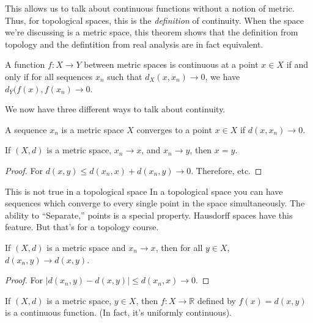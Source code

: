 \documentclass[crop=false,class=article,oneside]{standalone}
\begin{document}
            This allows us to talk about continuous
            functions without a notion of metric.
            Thus, for topological spaces, this is
            the \textit{definition} of continuity.
            When the space we're discussing is a
            metric space, this theorem shows that the
            definition from topology and the defintition
            from real analysis are in fact equivalent.
            \begin{theorem}
                A function $f:X\rightarrow{Y}$ between
                metric spaces is continuous at a point
                $x\in{X}$ if and only if for all
                sequences $x_{n}$ such that
                $d_{X}(x,x_{n})\rightarrow{0}$, we have
                $d_{Y}(f(x),f(x_{n})\rightarrow{0}$.
            \end{theorem}
            We now have three different ways to talk
            about continuity.
            \begin{definition}
                A sequence $x_{n}$ is a metric space
                $X$ converges to a point $x\in{X}$
                if $d(x,x_{n})\rightarrow{0}$.
            \end{definition}
            \begin{theorem}
                If $(X,d)$ is a metric space,
                $x_{n}\rightarrow{x}$,
                and $x_{n}\rightarrow{y}$,
                then $x=y$.
            \end{theorem}
            \begin{proof}
                For
                $d(x,y)\leq{d(x_{n},x)+d(x_{n},y)}%
                 \rightarrow{0}$. Therefore, etc.
            \end{proof}
            This is not true in a topological space
            In a topological space you can have sequences
            which converge to every single point in the
            space simultaneously. The ability to
            ``Separate,'' points is a special property.
            Hausdorff spaces have this feature. But
            that's for a topology course.
            \begin{theorem}
                If $(X,d)$ is a metric space
                and $x_{n}\rightarrow{x}$, then
                for all $y\in{X}$,
                $d(x_{n},y)\rightarrow{d(x,y)}$.
            \end{theorem}
            \begin{proof}
                For
                $|d(x_{n},y)-d(x,y)|\leq{d(x_{n},x)}%
                 \rightarrow{0}$.
            \end{proof}
            \begin{theorem}
                If $(X,d)$ is a metric space,
                $y\in{X}$, then
                $f:X\rightarrow\mathbb{R}$ defined by
                $f(x)=d(x,y)$ is a continuous function.
                (In fact, it's uniformly continuous).
            \end{theorem}
\end{document}
